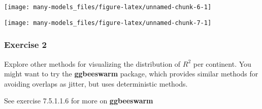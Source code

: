 \documentclass[]{book}
\newenvironment{Shaded}{\begin{snugshade}}{\end{snugshade}}
\newcommand{\DataTypeTok}[1]{\textcolor[rgb]{0.13,0.29,0.53}{#1}}
\newcommand{\FloatTok}[1]{\textcolor[rgb]{0.00,0.00,0.81}{#1}}
\newcommand{\KeywordTok}[1]{\textcolor[rgb]{0.13,0.29,0.53}{\textbf{#1}}}
\newcommand{\NormalTok}[1]{#1}
\newcommand{\OperatorTok}[1]{\textcolor[rgb]{0.81,0.36,0.00}{\textbf{#1}}}
\newcommand{\OtherTok}[1]{\textcolor[rgb]{0.56,0.35,0.01}{#1}}
\newcommand{\StringTok}[1]{\textcolor[rgb]{0.31,0.60,0.02}{#1}}
\theoremstyle{definition}
\theoremstyle{definition}
\theoremstyle{definition}
\theoremstyle{remark}
\begin{document}
\begin{center}\texttt{[image: many-models\_files/figure-latex/unnamed-chunk-6-1]} \end{center}

\begin{Shaded}
\end{Shaded}

\begin{center}\texttt{[image: many-models\_files/figure-latex/unnamed-chunk-7-1]} \end{center}

\hypertarget{exercise-2-61}{%
\subsubsection{Exercise 2}\label{exercise-2-61}}

Explore other methods for visualizing the distribution of \(R^2\) per
continent. You might want to try the \textbf{ggbeeswarm} package, which
provides similar methods for avoiding overlaps as jitter, but uses
deterministic methods.

See exercise 7.5.1.1.6 for more on \textbf{ggbeeswarm}

\begin{Shaded}
\end{Shaded}
\end{document}
